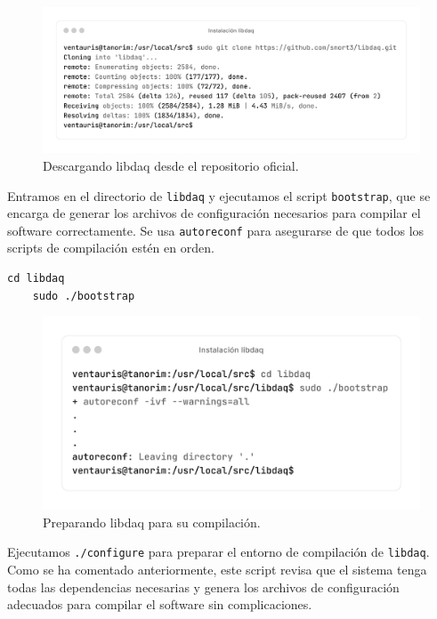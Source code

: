\documentclass[11pt,a4paper,twoside]{report}
\begin{document}
\begin{figure}[H]
	\centering
	\includegraphics[scale=0.12]{instalacion_snort/9-9.png}
	\caption{Descargando libdaq desde el repositorio oficial.}
\end{figure}

Entramos en el directorio de \texttt{libdaq} y ejecutamos el script \texttt{bootstrap}, que se encarga de generar los archivos de configuración necesarios para compilar el software correctamente. Se usa \texttt{autoreconf} para asegurarse de que todos los scripts de compilación estén en orden.

\begin{lstlisting}[style=commandstyle, caption={Ejecutando bootstrap para preparar la compilación de libdaq}]
	cd libdaq
	sudo ./bootstrap
\end{lstlisting}

\begin{figure}[H]
	\centering
	\includegraphics[scale=0.12]{instalacion_snort/10-10.png}
	\caption{Preparando libdaq para su compilación.}
\end{figure}

\newpage


Ejecutamos \texttt{./configure} para preparar el entorno de compilación de \texttt{libdaq}. Como se ha comentado anteriormente, este script revisa que el sistema tenga todas las dependencias necesarias y genera los archivos de configuración adecuados para compilar el software sin complicaciones.
\end{document}
